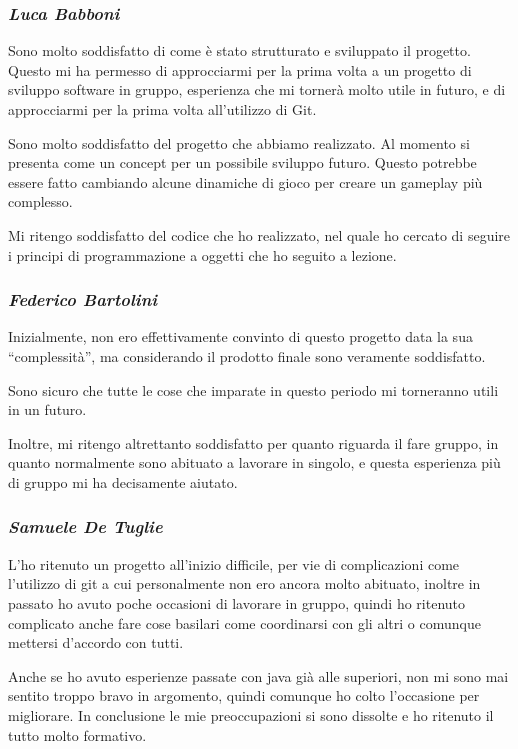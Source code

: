 \documentclass[a4paper,titlepage,12pt]{article}
\begin{document}
\subsubsection*{\large \slshape Luca Babboni}
\par \noindent Sono molto soddisfatto di come è stato strutturato e sviluppato il progetto. 
Questo mi ha permesso di approcciarmi per la prima volta a un progetto di sviluppo software in gruppo, esperienza che mi tornerà molto utile in futuro, e di approcciarmi per la prima volta all'utilizzo di Git. 
\par \noindent Sono molto soddisfatto del progetto che abbiamo realizzato. Al momento si presenta come un concept per un possibile sviluppo futuro. Questo potrebbe essere fatto cambiando alcune dinamiche di gioco per creare un gameplay più complesso. 
\par \noindent Mi ritengo soddisfatto del codice che ho realizzato, nel quale ho cercato di seguire i principi di programmazione a oggetti che ho seguito  a lezione.

\subsubsection*{\large \slshape Federico Bartolini}
\par \noindent Inizialmente, non ero effettivamente convinto di questo progetto data la sua “complessità”, ma considerando il prodotto finale sono veramente soddisfatto.
\par \noindent Sono sicuro che tutte le cose che imparate in questo periodo mi torneranno utili in un futuro.
\par \noindent Inoltre, mi ritengo altrettanto soddisfatto per quanto riguarda il fare gruppo, in quanto normalmente sono abituato a lavorare in singolo, e questa esperienza più di gruppo mi ha decisamente aiutato.

\subsubsection*{\large \slshape Samuele De Tuglie}
\par \noindent L’ho ritenuto un progetto all’inizio difficile, per vie di complicazioni come l’utilizzo di git a cui personalmente non ero ancora molto abituato, inoltre in passato ho avuto poche occasioni di lavorare in gruppo, quindi ho ritenuto complicato anche fare cose basilari come coordinarsi con gli altri o comunque mettersi d’accordo con tutti. 
\par \noindent Anche se ho avuto esperienze passate con java già alle superiori, non mi sono mai sentito troppo bravo in argomento, quindi comunque ho colto l’occasione per migliorare. 
In conclusione le mie preoccupazioni si sono dissolte e ho ritenuto il tutto molto formativo.
\end{document}
